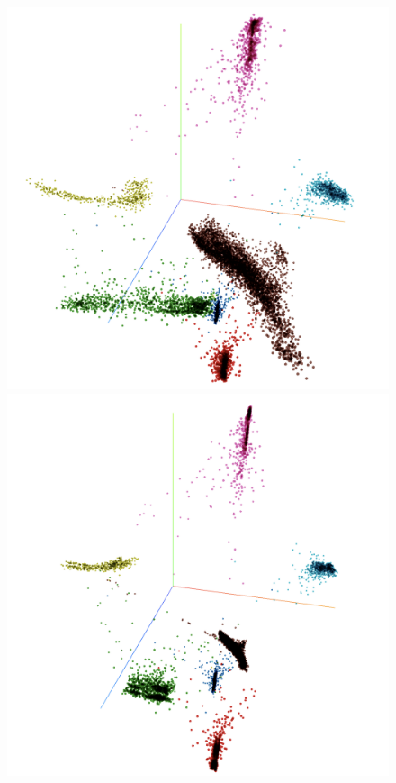 \begin{figure}[H]
  \centering
  \begin{threeparttable}
  \begin{minipage}[b]{0.45\linewidth}
    \includegraphics[width=\textwidth]{figures_new/from_old/tsne_embedding_projector_67}
  \end{minipage}
  \quad
  \begin{minipage}[b]{0.45\linewidth}
    \includegraphics[width=\textwidth]{figures_new/from_old/tsne_embedding_projector_102}

\end{minipage}
\end{threeparttable}
\end{figure}
